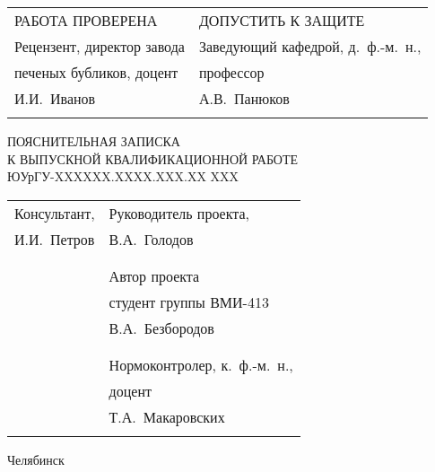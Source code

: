 \begin{titlepage}



\begin{spacing}{0.9}

\begin{tabularx}{\textwidth}{ XX }
РАБОТА ПРОВЕРЕНА & ДОПУСТИТЬ К ЗАЩИТЕ \\
Рецензент, директор завода & Заведующий кафедрой, д.~ф.-м.~н., \\
печеных бубликов, доцент & профессор \\
И.И.~Иванов & А.В.~Панюков \\
 &  \\
\end{tabularx}

\vspace{1cm}

\begin{center}

\end{center}

\vspace{1cm}

\begin{center}
ПОЯСНИТЕЛЬНАЯ ЗАПИСКА \\
К ВЫПУСКНОЙ КВАЛИФИКАЦИОННОЙ РАБОТЕ \\
ЮУрГУ-XXXXXX.XXXX.XXX.XX XXX
\end{center}

\vspace{1cm}

\begin{tabularx}{\textwidth}{ XX }
  Консультант, & Руководитель проекта, \\
  И.И.~Петров & В.А.~Голодов \\
   &  \\
  & \\
  & Автор проекта \\
  & студент группы ВМИ-413 \\
  & В.А.~Безбородов \\
  &  \\
  & \\
  & Нормоконтролер, к.~ф.-м.~н., \\
  & доцент \\
  & Т.А.~Макаровских \\
  &  \\
\end{tabularx}

\end{spacing}

\vspace{3cm}

\begin{center}
Челябинск 
\end{center}

\end{titlepage}